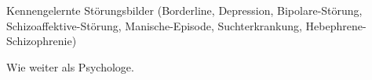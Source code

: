 

Kennengelernte Störungsbilder (Borderline, Depression, Bipolare-Störung, Schizoaffektive-Störung, Manische-Episode, Suchterkrankung, Hebephrene-Schizophrenie)

Wie weiter als Psychologe.

